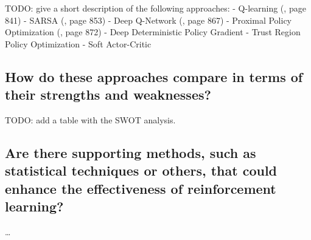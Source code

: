 TODO: give a short description of the following approaches:
- Q-learning (\cite{rn2022aima}, page 841)
- SARSA (\cite{rn2022aima}, page 853)
- Deep Q-Network (\cite{rn2022aima}, page 867)
- Proximal Policy Optimization (\cite{rn2022aima}, page 872)
- Deep Deterministic Policy Gradient
- Trust Region Policy Optimization
- Soft Actor-Critic

\subsection{How do these approaches compare in terms of their strengths and weaknesses?  }

TODO: add a table with the SWOT analysis.

\subsection{Are there supporting methods, such as statistical techniques or others, that could enhance the effectiveness of reinforcement learning?}

\dots
